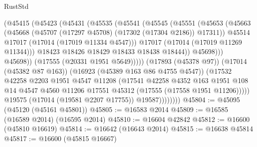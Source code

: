 \begin{lexlean}{RustStd}
\begin{coremodule}
{\begin{coremodule}
{{{{{{{{{{{{{{{{{{{{{{{{{{{{{{{{{{{{{{{{{{{{{{{{{{{{{{{                            (@45415
                              (@45423
                                (@45431
                                  (@45535
                                    (@45541
                                      (@45545
                                        (@45551
                                          (@45653
                                            (@45663
                                              (@45668
                                                (@45707
                                                  (@17297 @45708)
                                                  (@17302 (@17304 @2186))
                                                  @17311))
                                              @45514
                                              @17017
                                              (@17014 (@17019 @11334 @4547)))
                                            @17017
                                            (@17014 (@17019 @11269 @11344)))
                                          @18423
                                          @18426
                                          @18429
                                          @18433
                                          @18438
                                          @18444))
                                      @45698)))
                                @45698))
                            (@17555 (@20331 @1951 @5649)))))
                      (@17893 (@45378 @97))
                      (@17014 (@45382 @87 @163))
                      (@16923 (@45389 @163 @86 @4755 @4547))
                      (@17532
                        @42258
                        @2203
                        @1951
                        @4547
                        @11208
                        (@17541
                          @42258
                          @4352
                          @163
                          @1951
                          @108
                          @14
                          @4547
                          @4560
                          @11206
                          @17551
                          @45312
                          (@17555 (@17558 @1951 @11206)))))
                    @19575
                    (@17014 (@19581 @2207 @17755))
                    @19587))))))))
@45804 := @45095 (@45120 (@45161 @45801))
@45805 := @16583 @2014
@45809 := @16585 (@16589 @2014) (@16595 @2014)
@45810 := @16604 @42842
@45812 := @16600 (@45810 @16619)
@45814 := @16642 (@16643 @2014)
@45815 := @16638 @45814
@45817 := @16600 (@45815 @16667)
}}}}}}}}}}}}}}}}}}}}}}}}}}}}}}}}}}}}}}}}}}}}}}}}}}}}}}}
\end{coremodule}}
\end{coremodule}
\end{lexlean}
